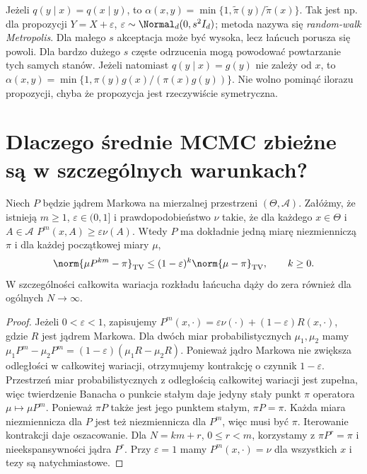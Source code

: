 \begin{przyklad}
Jeżeli $q(y\mid x)=q(x\mid y)$, to
$\alpha(x,y)=\min\{1,\widetilde\pi(y)/\widetilde\pi(x)\}$.
Tak jest np. dla propozycji $Y=X+\varepsilon$,
$\varepsilon\sim\Normal_d(0,s^2I_d)$; metoda nazywa się
\emph{random-walk Metropolis}. Dla małego $s$ akceptacja
może być wysoka, lecz łańcuch porusza się powoli. Dla
bardzo dużego $s$ częste odrzucenia mogą powodować
powtarzanie tych samych stanów.
Jeżeli natomiast $q(y\mid x)=g(y)$ nie zależy od $x$,
to $\alpha(x,y)=\min\{1,\pi(y)g(x)/(\pi(x)g(y))\}$.
Nie wolno pominąć ilorazu propozycji, chyba że
propozycja jest rzeczywiście symetryczna.
\end{przyklad}

\section{Dlaczego średnie MCMC zbieżne są w szczególnych warunkach?}
\begin{twierdzenie}
\label{thm:mcmc-minorization}
Niech $P$ będzie jądrem Markowa na mierzalnej przestrzeni
$(\Theta,\mathcal A)$. Załóżmy, że istnieją
$m\ge1$, $\varepsilon\in(0,1]$ i prawdopodobieństwo $\nu$
takie, że dla każdego $x\in\Theta$ i $A\in\mathcal A$
$P^m(x,A)\ge\varepsilon\nu(A)$.
Wtedy $P$ ma dokładnie jedną miarę niezmienniczą $\pi$
i dla każdej początkowej miary $\mu$,
\[
 \norm{\mu P^{km}-\pi}_{\rm TV}
 \le(1-\varepsilon)^k\norm{\mu-\pi}_{\rm TV},
 \qquad k\ge0.
\]
W szczególności całkowita wariacja rozkładu łańcucha
dąży do zera również dla ogólnych $N\to\infty$.
\end{twierdzenie}
\begin{proof}
Jeżeli $0<\varepsilon<1$, zapisujemy
$P^m(x,\cdot)=\varepsilon\nu(\cdot)
 +(1-\varepsilon)R(x,\cdot)$, gdzie $R$ jest jądrem
Markowa. Dla dwóch miar probabilistycznych $\mu_1,\mu_2$
mamy
$\mu_1P^m-\mu_2P^m=(1-\varepsilon)(\mu_1R-\mu_2R)$.
Ponieważ jądro Markowa nie zwiększa odległości
w całkowitej wariacji, otrzymujemy kontrakcję o czynnik
$1-\varepsilon$. Przestrzeń miar probabilistycznych
z odległością całkowitej wariacji jest zupełna,
więc twierdzenie Banacha o punkcie stałym daje
jedyny stały punkt $\pi$ operatora $\mu\mapsto\mu P^m$.
Ponieważ $\pi P$ także jest jego punktem stałym,
$\pi P=\pi$. Każda miara niezmiennicza dla $P$
jest też niezmiennicza dla $P^m$, więc musi być $\pi$.
Iterowanie kontrakcji daje oszacowanie.
Dla $N=km+r$, $0\le r<m$, korzystamy z
$\pi P^r=\pi$ i nieekspansywności jądra $P^r$.
Przy $\varepsilon=1$ mamy $P^m(x,\cdot)=\nu$
dla wszystkich $x$ i tezy są natychmiastowe.
\end{proof}

